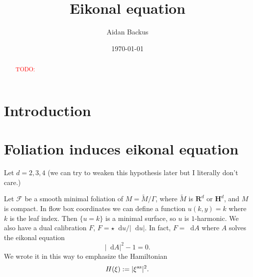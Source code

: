 \documentclass[reqno,11pt]{amsart}
\title{Eikonal equation}
\author{Aidan Backus}
\date{\today}
\newcommand{\RR}{\mathbf{R}}
\newcommand{\Hyp}{\mathbf H}
\newcommand*\dif{\mathop{}\!\mathrm{d}}
\theoremstyle{definition}
\numberwithin{equation}{section}
\newcommand\todo[1]{\textcolor{red}{TODO: #1}}
\begin{document}
\begin{abstract}
    \todo{}
\end{abstract}

\maketitle

\section{Introduction}

\section{Foliation induces eikonal equation}
Let $d = 2, 3, 4$ (we can try to weaken this hypothesis later but I literally don't care.)

Let $\mathscr F$ be a smooth minimal foliation of $M = \tilde M/\Gamma$, where $\tilde M$ is $\RR^d$ or $\Hyp^d$, and $M$ is compact.
In flow box coordinates we can define a function $u(k, y) = k$ where $k$ is the leaf index.
Then $\{u = k\}$ is a minimal surface, so $u$ is $1$-harmonic.
We also have a dual calibration $F$, $F = \star \dif u/|\dif u|$.
In fact, $F = \dif A$ where $A$ solves the eikonal equation
$$|\dif A|^2 - 1 = 0.$$
We wrote it in this way to emphasize the Hamiltonian
$$H(\xi) := |\xi^{\rm as}|^2.$$
\end{document}
